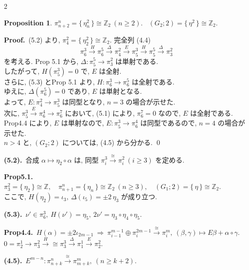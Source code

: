 \documentclass[10pt, leqno]{ltjsarticle}
\newcommand{\gen}[1]{\{\,#1\,\}}       %
\newcommand{\pit}[2]{\pi_{#1}^{#2}}
\numberwithin{equation}{section}
\theoremstyle{plain}
\newtheorem{proposition}[theorem]{Proposition}
\theoremstyle{definition}
\theoremstyle{remark}
\begin{document}
\begin{paracol}{2}

\begin{proposition}\label{prop:5.3}
\(\pi^{n}_{n+2}=\gen{\eta_n^{2}}\cong \mathbb Z_2\ (n\ge2).\) \
\((G_2;2)=\gen{\eta^{2}}\cong \mathbb Z_2 .\)
\end{proposition}

\noindent
\textbf{Proof.}\ 
 (5.2) より, \(\pi_{4}^{2}=\gen{\eta_2^{2}}\cong \mathbb Z_2 .\)
完全列 (4.4)
\[
\pi_{6}^{3}\xrightarrow{\ H}\pi_{6}^{5}\xrightarrow{\ \Delta\ }\pi_{4}^{2}
\xrightarrow{\ E\ }\pi_{5}^{3}\xrightarrow{\ H\ }\pi^{5}_{5}
\xrightarrow{\ \Delta\ }\pi_{3}^{2}
\]
を考える. Prop 5.1 から,
\(\Delta:\pi^{5}_{5}\to\pi_{3}^{2}\) は単射である. \\
したがって, \(H(\pi_{5}^{3})=0\) で, \(E\) は全射. \\
さらに, (5.3) とProp 5.1 より,
\(H:\pi^{3}_{6}\to\pi^{5}_{6}\) は全射である. \\
ゆえに, \(\Delta(\pi^{5}_{6})=0\) であり, 
\(E\) は単射となる. \\
よって, \(E:\pi_4^2\xrightarrow{}\pi_5^3\) は同型となり, \(n=3\) の場合が示せた. \\
次に, 
\(\pi_5^3\xrightarrow{E}\pi_6^4\xrightarrow{}\pi_6^7\)
において, (5.1) により,
\(\pit{6}{7}=0\) なので,
\(E\) は全射である. \\
Prop4.4 により, \(E\) は単射なので, 
\(E:\pit{5}{3}\to\pit{6}{4}\) は同型であるので, \(n=4\) の場合が示せた. \\
\(n>4\) と, \((G_2;2)\) については, (4.5) から分かる. 
\qed

\switchcolumn

\noindent
\textbf{(5.2).}\
\(\text{合成 } \alpha\longmapsto \eta_2\circ \alpha \text{ は, 同型 } 
\pi^{3}_{i}\xrightarrow{\cong}\pi^{2}_{i}\ (i\ge3) 
\text{ を定める. }\)

\noindent
\textbf{Prop5.1.}\
\(\pi^{2}_{3}=\gen{\eta_2}\cong\mathbb Z,\quad
\pi^{n}_{n+1}=\gen{\eta_n}\cong\mathbb Z_2\ (n\ge3),\quad
(G_1;2)=\gen{\eta}\cong\mathbb Z_2.\) \\
ここで, 
\(H(\eta_2)=\iota_3,\ \Delta(\iota_5)=\pm 2\,\eta_3\) が成り立つ. 

\noindent
\textbf{(5.3).}\
\(\nu'\in\pi_6^3,\ H(\nu')=\eta_5,\ 2\nu'=\eta_3\circ\eta_4\circ\eta_5 .\)

\noindent
\textbf{Prop4.4.}\
\(H(\alpha) = \pm 2\iota_{2m-1}\ \Longrightarrow\
\pit{i-1}{m-1}\oplus\pit{i}{2m-1}\xrightarrow{\cong}\pit{i}{m},\
(\beta,\gamma)\mapsto E\beta+\alpha\circ\gamma.\)\\
\(0=\pit{2}{1}\to\pit{3}{2}
\xrightarrow{H}{\cong}\pit{3}{3}
\xrightarrow{\Delta}\pit{1}{1}
\xrightarrow{E}\pit{2}{2}.\)

\noindent
\textbf{(4.5).}\
\(E^{m-n}:\pit{n+k}{n}\xrightarrow{\cong}\pit{m+k}{m},\
(n\ge k+2). \)


\end{paracol}
\end{document}
